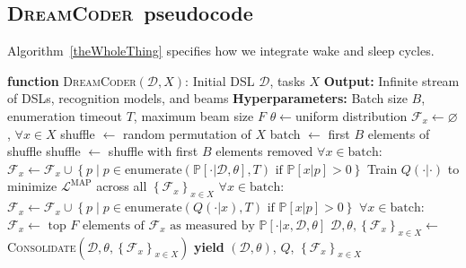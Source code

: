 \documentclass{article}
\newcommand{\system}{\textsc{DreamCoder}~}
\newcommand{\systemEnding}{\textsc{DreamCoder}}
\newcommand{\probability}{\mathds{P}} %
\begin{document}
\subsection{\system pseudocode}\label{systemPseudocode}

Algorithm~\ref{theWholeThing} specifies how we integrate wake and
sleep cycles.
\begin{algorithm}
  \caption{Full \system algorithm}\label{theWholeThing}
  \begin{algorithmic}[1]
    \State \textbf{function} \systemEnding$(\mathcal{D}, X)$:
     Initial DSL $\mathcal{D}$, tasks $X$
    \State \textbf{Output:} Infinite stream of DSLs, recognition models, and beams
    \State \textbf{Hyperparameters:} Batch size $B$, enumeration timeout $T$, maximum beam size $F$
    \State $\theta\gets $uniform distribution
    \State $\mathcal{F}_x\gets\varnothing $, $\forall x\in X$
    \State shuffle $\gets$ random permutation of $X$
    \State batch $\gets$ first $B$ elements of shuffle
    \State shuffle $\gets$ shuffle with first $B$ elements removed
    \State $\forall x\in \text{batch}$: $\mathcal{F}_x\gets\mathcal{F}_x\cup \left\{p\;|\;p\in \text{enumerate}(\probability[\cdot |\mathcal{D},\theta],T)\text{ if }\probability[x|p] > 0 \right\}$
    \State Train $Q(\cdot |\cdot )$ to minimize $\mathcal{L}^{\text{MAP}}$ across all $\left\{\mathcal{F}_x \right\}_{x\in X}$
    \State $\forall x\in \text{batch}$: $\mathcal{F}_x\gets\mathcal{F}_x\cup \left\{p\;|\;p\in \text{enumerate}(Q(\cdot |x),T)\text{ if }\probability[x|p] > 0 \right\}$
    \State $\forall x\in \text{batch}$: $\mathcal{F}_x\gets\text{ top }F\text{ elements of }\mathcal{F}_x\text{ as measured by }\probability[\cdot |x,\mathcal{D},\theta]$
    \State $\mathcal{D},\theta,\left\{\mathcal{F}_x \right\}_{x\in X}\gets $\textsc{Consolidate}$(\mathcal{D},\theta,\left\{\mathcal{F}_x \right\}_{x\in X})$
    \State \textbf{yield} $(\mathcal{D},\theta)$, $Q$, $\left\{\mathcal{F}_x \right\}_{x\in X}$ 
    \EndWhile
    \EndWhile

  \end{algorithmic}
\end{algorithm}
\end{document}
